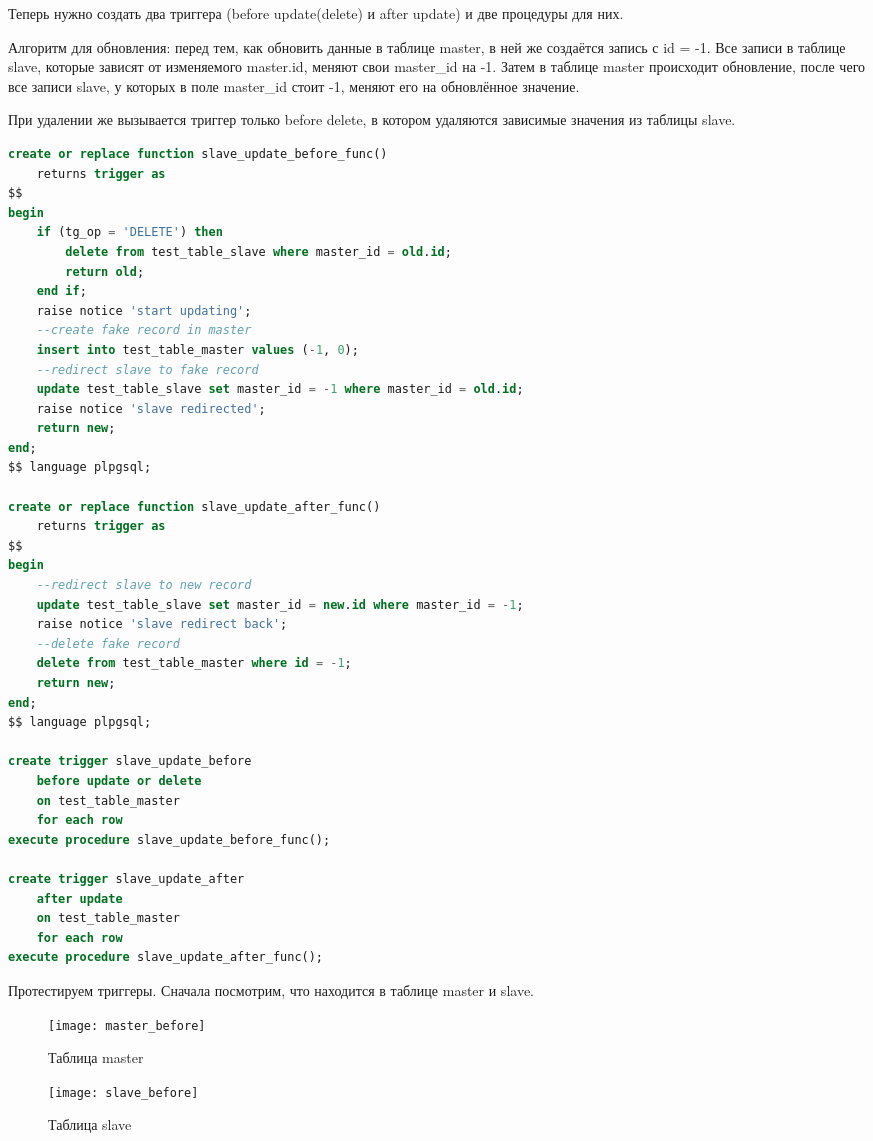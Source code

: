Теперь нужно создать два триггера (before update(delete) и after update) и две процедуры для них.

Алгоритм для обновления:
перед тем, как обновить данные в таблице master, в ней же создаётся запись с id = -1. Все записи в таблице slave, которые зависят от изменяемого master.id, меняют свои master\_id на -1. Затем в таблице master происходит обновление, после чего все записи slave, у которых в поле master\_id стоит -1, меняют его на обновлённое значение.

При удалении же вызывается триггер только before delete, в котором удаляются зависимые значения из таблицы slave.

\begin{lstlisting}[caption=Код триггеров и процедур, language=SQL]
create or replace function slave_update_before_func()
	returns trigger as
$$
begin
	if (tg_op = 'DELETE') then
		delete from test_table_slave where master_id = old.id;
		return old;
	end if;
	raise notice 'start updating';
	--create fake record in master
	insert into test_table_master values (-1, 0);
	--redirect slave to fake record
	update test_table_slave set master_id = -1 where master_id = old.id;
	raise notice 'slave redirected';
	return new;
end;
$$ language plpgsql;

create or replace function slave_update_after_func()
	returns trigger as
$$
begin
	--redirect slave to new record
	update test_table_slave set master_id = new.id where master_id = -1;
	raise notice 'slave redirect back';
	--delete fake record
	delete from test_table_master where id = -1;
	return new;
end;
$$ language plpgsql;

create trigger slave_update_before
	before update or delete
	on test_table_master
	for each row
execute procedure slave_update_before_func();

create trigger slave_update_after
	after update
	on test_table_master
	for each row
execute procedure slave_update_after_func();
\end{lstlisting}

Протестируем триггеры. Сначала посмотрим, что находится в таблице master и slave.

\begin{figure}[!htb]
	\texttt{[image: master\_before]}
	\caption{Таблица master}\label{fig:master}
	\endminipage\hfill
	\texttt{[image: slave\_before]}
	\caption{Таблица slave}\label{fig:slave}
	\endminipage\hfill
\end{figure}

